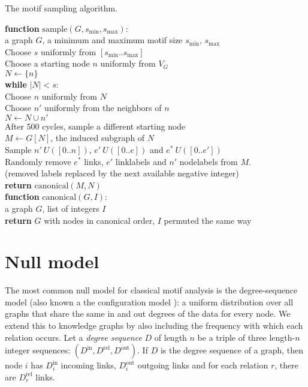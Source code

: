 \documentclass[11pt]{article}
\newcommand{\tab}{\hspace*{5mm}}
\newcommand{\from}{\leftarrow}
\begin{document}
\begin{pseudo}[tb]
\caption{The motif sampling algorithm.}

\textbf{function} $\text{sample}(G, s_\text{min}, s_\text{max})$:\\
\tab\tab a graph $G$, a minimum and maximum motif size $s_\text{min}$, $s_\text{max}$ \\

\tab Choose $s$ uniformly from $[s_\text{min} .. s_\text{max}]$ \\
\tab Choose a starting node $n$ uniformly from $V_G$ \\
\tab $N \from \{n\}$ \\
\tab \textbf{while} $|N| < s$:\\
\tab \tab Choose $n$ uniformly from $N$\\
\tab \tab Choose $n'$ uniformly from the neighbors of $n$\\
\tab \tab $N \from N \cup n'$ \\
\tab \tab After 500 cycles, sample a different starting node\\

\tab $M \from G[N]$, the induced subgraph of $N$ \\
\tab  Sample $n' ~ U([0.. n])$, $e' ~ U([0.. e])$ and $e^*~ U([0..e'])$\\
\tab Randomly remove $e^*$ links, $e'$ linklabels and $n'$ nodelabels from $M$.\\
\tab\tab (removed labels replaced by the next available negative integer)\\


\tab \textbf{return} $\text{canonical}(M, N)$ \\

\textbf{function} $\text{canonical}(G, I)$:\\
\tab\tab a graph $G$, list of integers $I$\\
\tab \textbf{return} $G$ with nodes in canonical order, $I$ permuted the same way
\label{algorithm:sampling}
\end{pseudo}

\section{Null model}

\label{section:null-model}

The most common null model for classical motif analysis is the degree-sequence model (also known a the configuration model \cite{}): a uniform distribution over all graphs that share the same in and out degrees of the data for every node. We extend this to knowledge graphs by also including the frequency with which each relation occurs. Let a \emph{degree sequence} $D$ of length $n$ be a triple of three length-$n$ integer sequences: $(D^\text{in}, D^\text{rel}, D^\text{out})$. If $D$ is the degree sequence of a graph, then node $i$ has $D^\text{in}_i$ incoming links,  $D^\text{out}_i$ outgoing links and for each relation $r$, there are $D^\text{rel}_r$ links.
\end{document}
